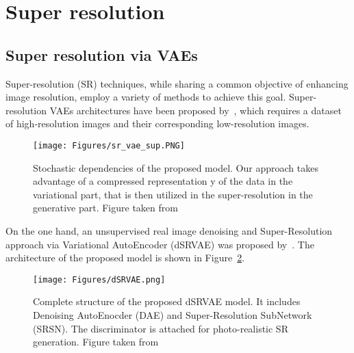 \tocless\section{Super resolution}
\tocless\subsection{Super resolution via VAEs}
Super-resolution (SR) techniques, while sharing a common objective of enhancing
image resolution, employ a variety of methods to achieve this goal. 
Super-resolution VAEs architectures have been proposed
by~\citep{gatopoulos2020super}, 
which requires a dataset of high-resolution images and their corresponding
low-resolution images. 
\begin{figure}[htb!]
    \centering
    \texttt{[image: Figures/sr\_vae\_sup.PNG]}
    \caption{Stochastic dependencies of the proposed model. Our approach
    takes advantage of a compressed representation y of the data in the
    variational part, that is then utilized in the super-resolution in the
    generative part.
    Figure taken from~\citep{gatopoulos2020super}}
    \label{fig:srvae_network_sup}
\end{figure}
On the one hand, an unsupervised real image denoising 
and Super-Resolution approach via Variational
AutoEncoder (dSRVAE) was proposed by~\citep{liu2020unsupervised}.
The architecture of the proposed model is shown in Figure~\ref{fig:srvae_network}.

\begin{figure}[htb!]
    \centering
    \texttt{[image: Figures/dSRVAE.png]}
    \caption{Complete structure of the proposed dSRVAE model. It includes
    Denoising AutoEnocder (DAE) and Super-Resolution SubNetwork (SRSN). The
    discriminator is attached for photo-realistic SR generation.
    Figure taken from~\citep{liu2020unsupervised}}
    \label{fig:srvae_network}
\end{figure}

